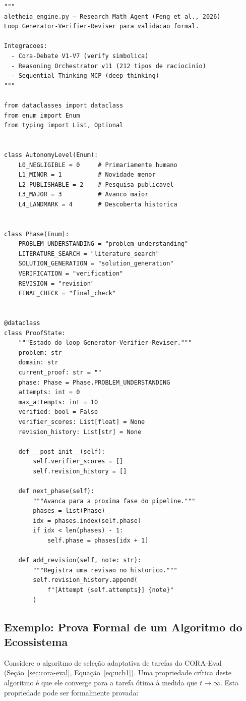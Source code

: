 \begin{lstlisting}[caption={aletheia\_engine.py — Generator-Verifier-Reviser Loop},
label={lst:aletheia-engine}, style=pythonstyle]
"""
aletheia_engine.py — Research Math Agent (Feng et al., 2026)
Loop Generator-Verifier-Reviser para validacao formal.

Integracoes:
  - Cora-Debate V1-V7 (verify simbolica)
  - Reasoning Orchestrator v11 (212 tipos de raciocinio)
  - Sequential Thinking MCP (deep thinking)
"""

from dataclasses import dataclass
from enum import Enum
from typing import List, Optional


class AutonomyLevel(Enum):
    L0_NEGLIGIBLE = 0     # Primariamente humano
    L1_MINOR = 1          # Novidade menor
    L2_PUBLISHABLE = 2    # Pesquisa publicavel
    L3_MAJOR = 3          # Avanco maior
    L4_LANDMARK = 4       # Descoberta historica


class Phase(Enum):
    PROBLEM_UNDERSTANDING = "problem_understanding"
    LITERATURE_SEARCH = "literature_search"
    SOLUTION_GENERATION = "solution_generation"
    VERIFICATION = "verification"
    REVISION = "revision"
    FINAL_CHECK = "final_check"


@dataclass
class ProofState:
    """Estado do loop Generator-Verifier-Reviser."""
    problem: str
    domain: str
    current_proof: str = ""
    phase: Phase = Phase.PROBLEM_UNDERSTANDING
    attempts: int = 0
    max_attempts: int = 10
    verified: bool = False
    verifier_scores: List[float] = None
    revision_history: List[str] = None

    def __post_init__(self):
        self.verifier_scores = []
        self.revision_history = []

    def next_phase(self):
        """Avanca para a proxima fase do pipeline."""
        phases = list(Phase)
        idx = phases.index(self.phase)
        if idx < len(phases) - 1:
            self.phase = phases[idx + 1]

    def add_revision(self, note: str):
        """Registra uma revisao no historico."""
        self.revision_history.append(
            f"[Attempt {self.attempts}] {note}"
        )
\end{lstlisting}

\subsection{Exemplo: Prova Formal de um Algoritmo do Ecossistema}

Considere o algoritmo de seleção adaptativa de tarefas do CORA-Eval
(Seção~\ref{sec:cora-eval}, Equação~\ref{eq:ucb1}). Uma propriedade
crítica deste algoritmo é que ele converge para a tarefa ótima à
medida que $t \to \infty$. Esta propriedade pode ser formalmente
provada:

